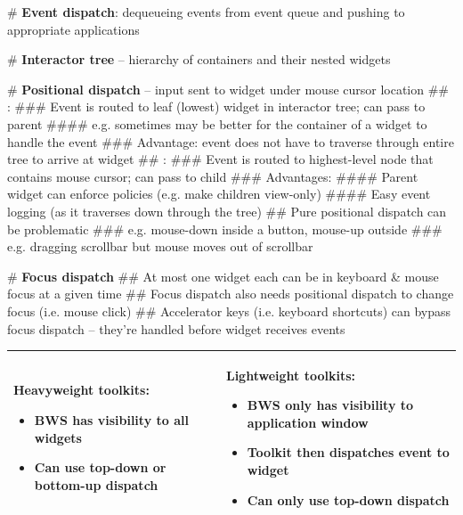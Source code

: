 \documentclass[11pt, oneside]{article}
\newcommand*{\un}[1]{\underline{\smash{#1}}}        %
\newenvironment{itemized}{\begin{itemize}[noitemsep, topsep=0pt, leftmargin=*]}{\end{itemize}}  %
\begin{document}
# \textbf{Event dispatch}: dequeueing events from event queue and pushing to appropriate applications

# \textbf{Interactor tree} -- hierarchy of containers and their nested widgets

# \textbf{Positional dispatch} -- input sent to widget under mouse cursor location
## \un{Bottom-up dispatch}:
### Event is routed to leaf (lowest) widget in interactor tree; can pass to parent
#### e.g. sometimes may be better for the container of a widget to handle the event
### Advantage: event does not have to traverse through entire tree to arrive at widget
## \un{Top-down dispatch}:
### Event is routed to highest-level node that contains mouse cursor; can pass to child
### Advantages:
#### Parent widget can enforce policies (e.g. make children view-only)
#### Easy event logging (as it traverses down through the tree)
## Pure positional dispatch can be problematic
### e.g. mouse-down inside a button, mouse-up outside
### e.g. dragging scrollbar but mouse moves out of scrollbar

# \textbf{Focus dispatch}
## At most one widget each can be in keyboard \& mouse focus at a given time
## Focus dispatch also needs positional dispatch to change focus (i.e. mouse click)
## Accelerator keys (i.e. keyboard shortcuts) can bypass focus dispatch -- they're handled before widget receives events

\hspace{-2em}
\begin{tabular}{|l|l|}
\hline
\begin{minipage}[t]{0.45\textwidth}
\textbf{Heavyweight toolkits}:
    \begin{itemized}
    \item BWS has visibility to all widgets
    \item Can use top-down or bottom-up dispatch
    \end{itemized}
    \vspace*{0.5em}
\end{minipage}
&
\begin{minipage}[t]{0.45\textwidth}
\textbf{Lightweight toolkits}:
    \begin{itemized}
    \item BWS only has visibility to application window
    \item Toolkit then dispatches event to widget
    \item Can only use top-down dispatch
    \end{itemized}
    \vspace*{0.5em}
\end{minipage}  \\
\hline
\end{tabular} \\
\end{document}

